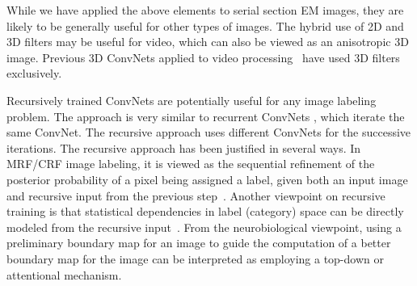 \documentclass{article} %
\begin{document}
\begin{enumerate}[]
\end{enumerate}


While we have applied the above elements to serial section EM images,
they are likely to be generally useful for other types of images. The
hybrid use of 2D and 3D filters may be useful for video, which can
also be viewed as an anisotropic 3D image.  Previous 3D ConvNets
applied to video processing~\cite{Tran2014,Yao2015} have used 3D
filters exclusively.

Recursively trained ConvNets are potentially useful for any image labeling
problem.  The approach is very similar to recurrent ConvNets
\cite{Pinheiro2014}, which iterate the same ConvNet.  The recursive
approach uses different ConvNets for the successive iterations. The
recursive approach has been justified in several ways. In MRF/CRF
image labeling, it is viewed as the sequential refinement of the
posterior probability of a pixel being assigned a label, given both an
input image and recursive input from the previous
step~\cite{Tu2008}. Another viewpoint on recursive training is that
statistical dependencies in label (category) space can be directly
modeled from the recursive input~\cite{Huang2014}.  From the
neurobiological viewpoint, using a preliminary boundary map for an
image to guide the computation of a better boundary map for the image
can be interpreted as employing a top-down or attentional mechanism.
\end{document}
